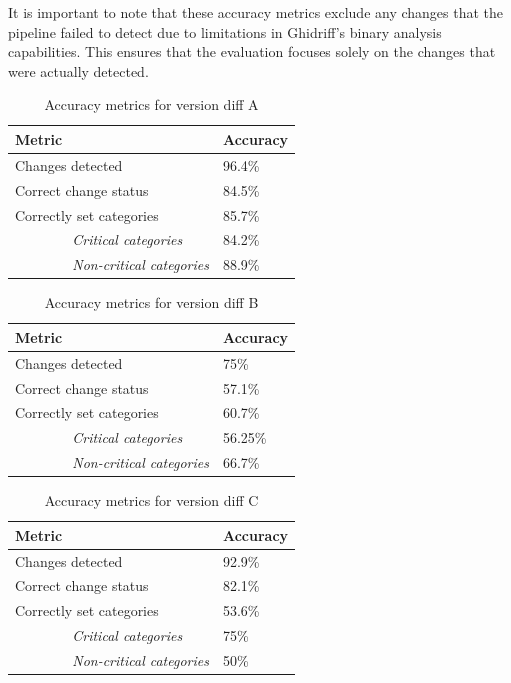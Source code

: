 It is important to note that these accuracy metrics exclude any changes that the pipeline failed to detect due to limitations in Ghidriff's binary analysis capabilities. This ensures that the evaluation focuses solely on the changes that were actually detected.


\begin{table}[H]
    \centering
    \begin{tabular}{l l}
        \toprule
        \textbf{Metric} & \textbf{Accuracy} \\
        \midrule
        Changes detected & 96.4\% \\
        Correct change status & 84.5\% \\
        Correctly set categories & 85.7\% \\
        \textit{\ \ \ \ \ \ \ \ Critical categories} & 84.2\% \\
        \textit{\ \ \ \ \ \ \ \ Non-critical categories} & 88.9\% \\
        \bottomrule
    \end{tabular}
    \caption{Accuracy metrics for version diff A}
    \label{tab:accuracy_A}
\end{table}

\begin{table}[H]
    \centering
    \begin{tabular}{l l}
        \toprule
        \textbf{Metric} & \textbf{Accuracy} \\
        \midrule
        Changes detected                 & 75\% \\
        Correct change status            & 57.1\% \\
        Correctly set categories & 60.7\% \\
        \textit{\ \ \ \ \ \ \ \ Critical categories} & 56.25\% \\
        \textit{\ \ \ \ \ \ \ \ Non-critical categories} & 66.7\% \\
        \bottomrule
    \end{tabular}
    \caption{Accuracy metrics for version diff B}
    \label{tab:accuracy_B}
\end{table}

\begin{table}[H]
    \centering
    \begin{tabular}{l l}
        \toprule
        \textbf{Metric} & \textbf{Accuracy} \\
        \midrule
        Changes detected                 & 92.9\% \\
        Correct change status            & 82.1\% \\
        Correctly set categories & 53.6\% \\
        \textit{\ \ \ \ \ \ \ \ Critical categories} & 75\% \\
        \textit{\ \ \ \ \ \ \ \ Non-critical categories} & 50\% \\
        \bottomrule
    \end{tabular}
    \caption{Accuracy metrics for version diff C}
    \label{tab:accuracy_C}
\end{table}




